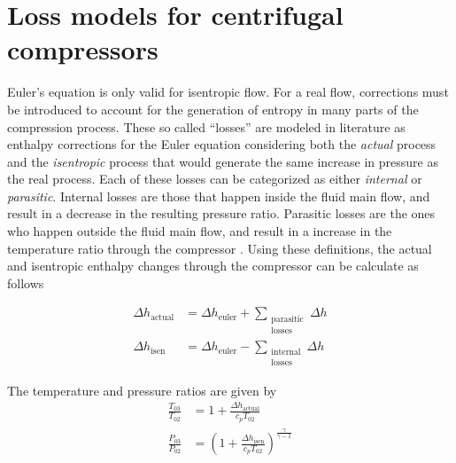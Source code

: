 \documentclass[tcc]{subfiles}
\begin{document}
\section{Loss models for centrifugal compressors}
\label{sec:compressor_losses}
Euler's equation is only valid for isentropic flow. 
For a real flow, corrections must be introduced to account for the generation of entropy in many parts of the compression process. 
These so called ``losses'' are modeled in literature as enthalpy corrections 
for the Euler equation considering both the \emph{actual} process and the \emph{isentropic} process 
that would generate the same increase in pressure as the real process.
Each of these losses can be categorized as either \emph{internal} or \emph{parasitic}.
Internal losses are those that happen inside the fluid main flow, and result in a decrease in the resulting pressure ratio.
Parasitic losses are the ones who happen outside the fluid main flow, 
and result in a increase in the temperature ratio through the compressor \cite{Galvas1973}.
Using these definitions, the actual and isentropic enthalpy changes through the compressor can be calculate as follows

\begin{align}
    \Delta h_{\text{actual}} &= \Delta h_{\text{euler}} + \sum_{\substack{
                                                            \text{parasitic} \\ 
                                                            \text{losses}
                                                        }}
                                                          \Delta h \\
    \Delta h_{\text{isen}}  &= \Delta h_{\text{euler}} - \sum_{\substack{
                                                            \text{internal} \\ 
                                                            \text{losses}
                                                        }}
                                                          \Delta h
\end{align}

The temperature and pressure ratios are given by
\begin{align}
    \frac{T_{03}}{T_{02}} &= 1 + \frac{\Delta h_{\text{actual}}}{c_p T_{02}} \\
    \frac{P_{03}}{P_{02}} &= \left( 1 + \frac{\Delta h_{\text{isen}}}{c_p T_{02}}\right)^{\frac{\gamma}{\gamma-1}}
\end{align}
\end{document}
